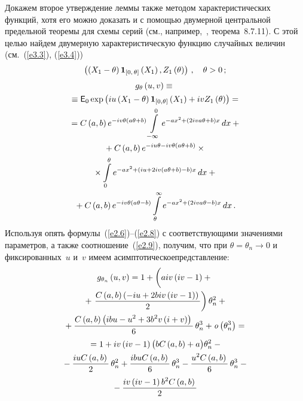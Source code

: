 \begin{multicols}{2}
Докажем второе утверждение леммы также методом характеристических функций,
хотя его можно доказать и с помощью двумерной центральной предельной
теоремы для схемы серий (см., например,~\cite{2be}, теорема~8.7.11). С этой
целью найдем двумерную характеристическую функцию  случайных величин
(см.~(\ref{e3.3}), (\ref{e3.4}))
$$
\left(\left(X_{1}-\theta \right){{\bf 1}}_{\left[0,\,\theta\right]}\left(X_{1}\right),Z_{1}
\left(\theta\right)\right)\,,\quad \theta>0\,;
$$
\begin{multline*}
g_{\theta}\left(u,v\right)\equiv{}\\
{}\equiv {{\sf E}}_{0} \exp\left(iu\left(X_{1}
-\theta\right){{\bf 1}}_{\left[0,\theta\right]}\left(X_{1}
\right)+ivZ_{1}\left(\theta\right)\right)={}\\
{}
= C\left(a,b\right) e^{-iv\theta\left(a\theta + b\right)} 
\int\limits_{-\infty }^{0} e^{-ax^{2} + \left(2iva\theta + b\right)x}\,dx +{}\\
{}+ 
C\left(a,b\right)e^{-iu\theta - iv\theta\left(a\theta + 
b\right)}\times{}\\
{}\times \int\limits_{0}^{\theta } e^{-ax^{2} + \left(iu + 2iv\left(a\theta + b\right) - b\right)x}\,
dx +{}\\
{}
+ C\left(a,b\right) e^{-iv\theta\left(a\theta 
- b\right)} \int\limits_{\theta }^{\infty } 
e^{-ax^{2} + \left(2iva\theta - b\right)x}\,dx\,.
\end{multline*}
Используя опять  формулы~(\ref{e2.6})--(\ref{e2.8})
с со\-от\-вет\-ст\-ву\-ющи\-ми значениями параметров, а также соотношение~(\ref{e2.9}),
получим, что  при $\theta=\theta_{n}\to 0$ и
фиксированных~$u$ и~$v$ имеем асимптотическое\linebreak пред\-став\-ле\-ние:
\begin{multline*}
g_{\theta_{n}}\left(u,v\right)=1+\left(
\vphantom{\fr{C}{2}}
aiv\left(iv-1\right)
+{}\right.\\
{}+\left.\fr{C\left(a,b\right)\left(-iu+ 2 b i v\left(
iv-1\right)\right)}{2}\right)\theta_{n}^{2}+{}\\
{}
+\fr{C\left(a,b\right)\left(ibu-u^{2}
+ 3b^{2}v\left(i + v\right)\right)}{6}\,\theta_{n}^{3} +{\it o}
\left(\theta_{n}^{3}\right)={}\\
{}
=1 + iv\left(iv - 1\right)\bigl(bC\left(a,b\right) + a\bigr)
\theta_{n}^{2} -{}\\
{}- \fr{iuC\left(a,b\right)}{2}\,
\theta_{n}^{2}+ \fr{ibuC\left(a,b\right)}{6}\,
\theta_{n}^{3} - \fr{u^{2} C\left(a,b\right)}{6}\,\theta_{n}^{3}-{}\\
{}- 
\fr{iv\left(iv - 1\right)b^{2}C\left(a,b\right)}{2}\,

\end{multline*}
\end{multicols}

